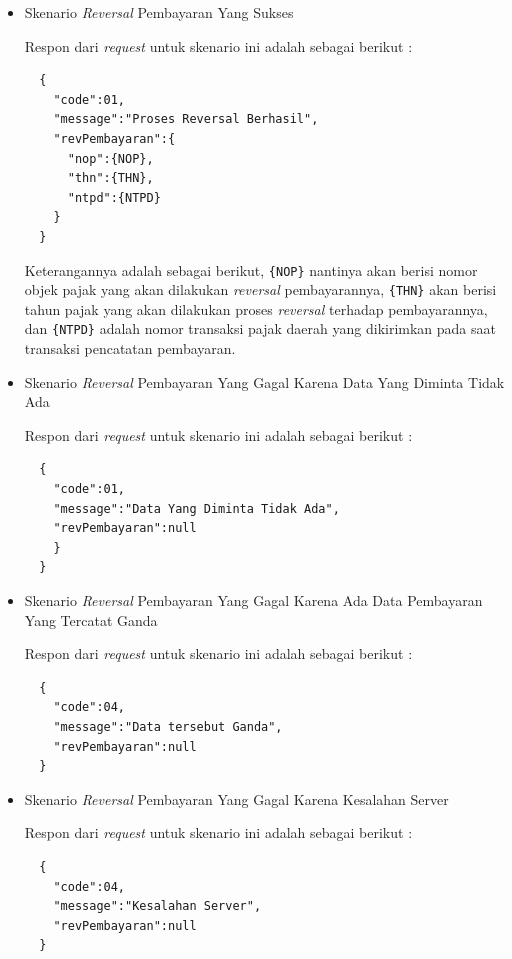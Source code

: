 \documentclass[pdftex,12pt, oneside]{article}
\begin{document}
\begin{itemize}
  \item Skenario \textit{Reversal} Pembayaran Yang Sukses
  
  Respon dari \textit{request} untuk skenario ini adalah sebagai berikut :
  
  \begin{lstlisting}
  {
    "code":01,
    "message":"Proses Reversal Berhasil",
    "revPembayaran":{
      "nop":{NOP},
      "thn":{THN},
      "ntpd":{NTPD}
    }
  }
  \end{lstlisting}
  
  Keterangannya adalah sebagai berikut, \texttt{\{NOP\}} nantinya akan berisi nomor objek pajak yang akan dilakukan \textit{reversal} pembayarannya, \texttt{\{THN\}} akan berisi tahun pajak yang akan dilakukan proses \textit{reversal} terhadap pembayarannya, dan \texttt{\{NTPD\}} adalah nomor transaksi pajak daerah yang dikirimkan pada saat transaksi pencatatan pembayaran.
  
  \item Skenario \textit{Reversal} Pembayaran Yang Gagal Karena Data Yang Diminta Tidak Ada
  
  Respon dari \textit{request} untuk skenario ini adalah sebagai berikut :
  
  \begin{lstlisting}
  {
    "code":01,
    "message":"Data Yang Diminta Tidak Ada",
    "revPembayaran":null
    }
  }
  \end{lstlisting}
  
  \item Skenario \textit{Reversal} Pembayaran Yang Gagal Karena Ada Data Pembayaran Yang Tercatat Ganda
  
  Respon dari \textit{request} untuk skenario ini adalah sebagai berikut :
  
  \begin{lstlisting}
  {
    "code":04,
    "message":"Data tersebut Ganda",
    "revPembayaran":null
  }
  \end{lstlisting}
  
  \item Skenario \textit{Reversal} Pembayaran Yang Gagal Karena Kesalahan Server
  
  Respon dari \textit{request} untuk skenario ini adalah sebagai berikut :
  
  \begin{lstlisting}
  {
    "code":04,
    "message":"Kesalahan Server",
    "revPembayaran":null
  }
  \end{lstlisting}
  
\end{itemize}
\end{document}
